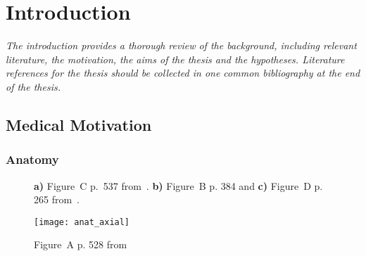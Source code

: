 \chapter{Introduction}

\textit{The introduction provides a thorough review of the background, including relevant literature, the motivation, the aims of the thesis and the hypotheses. Literature references for the thesis should be collected in one common bibliography at the end of the thesis.}


\section{Medical Motivation}

\subsection{Anatomy}

\begin{figure}[htbp]
    \begin{minipage}[c][0.9\textheight][t]{.5\textwidth}
        \centering
        \vspace*{\fill}
    \end{minipage}
    \begin{minipage}[c][0.9\textheight][t]{.5\textwidth}
        \centering
        \vspace*{\fill}
        \vfill
    \end{minipage}
    \vspace*{-0.3cm}
    \caption[Anatomy of the Peripheral Nervous System of the Lower Extremity]{\textbf{a)} Figure~C p.~537 from~\cite{Schunke2014PrometheusAnatomie}. \textbf{b)} Figure~B p. 384 and \textbf{c)} Figure~D p. 265 from~\cite{Schunke2015THIEMEAnatomy}.}
    \label{fig:anat}
\end{figure}

\begin{figure}[htbp]
	\texttt{[image: anat\_axial]}
    \caption[Cross-section of the Right Upper Leg]{Figure~A p. 528 from~\cite{Schunke2014PrometheusAnatomie}}
    \label{fig:anat_axial}
\end{figure}


